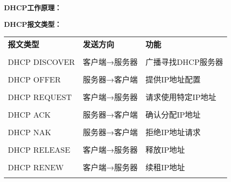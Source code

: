 \documentclass[lang=cn,newtx,10pt,scheme=chinese]{../../elegantbook}
\begin{document}
\textbf{DHCP工作原理：}

\textbf{DHCP报文类型：}
\begin{longtable}{@{}p{3cm}p{4cm}p{6cm}@{}}
\toprule
\textbf{报文类型} & \textbf{发送方向} & \textbf{功能} \\\\ \midrule
\endhead

DHCP DISCOVER & 客户端→服务器 & 广播寻找DHCP服务器 \\\\
DHCP OFFER & 服务器→客户端 & 提供IP地址配置 \\\\
DHCP REQUEST & 客户端→服务器 & 请求使用特定IP地址 \\\\
DHCP ACK & 服务器→客户端 & 确认分配IP地址 \\\\
DHCP NAK & 服务器→客户端 & 拒绝IP地址请求 \\\\
DHCP RELEASE & 客户端→服务器 & 释放IP地址 \\\\
DHCP RENEW & 客户端→服务器 & 续租IP地址 \\\\

\bottomrule
\end{longtable}
\end{document}
